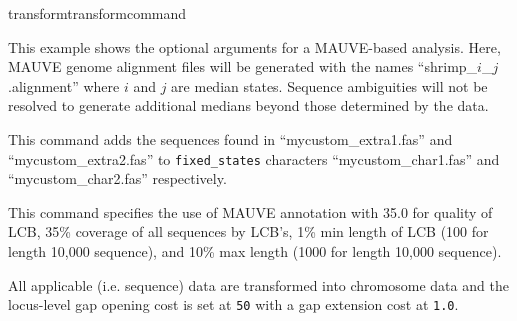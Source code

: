 \begin{command}{transform}{transformcommand}
\begin{poyexamples}
		{This example shows the optional arguments for a MAUVE-based  analysis.
		Here, MAUVE genome alignment files will be generated with the names ``shrimp\_$i$\_$j$.alignment'' 
		where $i$ and $j$ are median states.  Sequence ambiguities will not be resolved to generate 
		additional medians beyond those determined by the data.}
		
		{This command adds the sequences found in ``mycustom\_extra1.fas'' and ``mycustom\_extra2.fas'' 
		to \texttt{fixed\_states} characters 
		``mycustom\_char1.fas'' and ``mycustom\_char2.fas'' respectively.}
	         	
		{This command specifies the use of MAUVE annotation with 35.0 for quality of LCB,
		35\% coverage of all sequences by LCB's, 1\% min length of LCB (100 for length 10,000 
		sequence), and 10\% max length (1000 for length 10,000 sequence).}
		
          
          
          {All applicable (i.e. sequence) data are transformed into chromosome data 
		and the locus-level gap opening cost is set at \texttt{50} with a gap extension cost at \texttt{1.0}.}
              		          
	\end{poyexamples}	    

\end{command}


